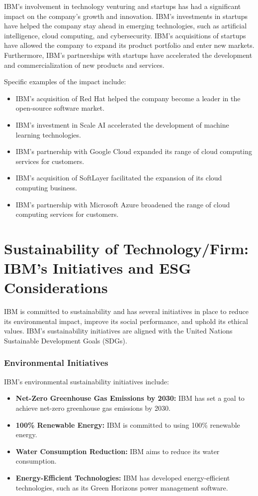 IBM's involvement in technology venturing and startups has had a significant impact on the company's growth and innovation. IBM's investments in startups have helped the company stay ahead in emerging technologies, such as artificial intelligence, cloud computing, and cybersecurity. IBM's acquisitions of startups have allowed the company to expand its product portfolio and enter new markets. Furthermore, IBM's partnerships with startups have accelerated the development and commercialization of new products and services.

Specific examples of the impact include:

\begin{itemize}
    \item IBM's acquisition of Red Hat helped the company become a leader in the open-source software market.
    \item IBM's investment in Scale AI accelerated the development of machine learning technologies.
    \item IBM's partnership with Google Cloud expanded its range of cloud computing services for customers.
    \item IBM's acquisition of SoftLayer facilitated the expansion of its cloud computing business.
    \item IBM's partnership with Microsoft Azure broadened the range of cloud computing services for customers.
\end{itemize}


\section{Sustainability of Technology/Firm: IBM's Initiatives and ESG Considerations}

IBM is committed to sustainability and has several initiatives in place to reduce its environmental impact, improve its social performance, and uphold its ethical values. IBM's sustainability initiatives are aligned with the United Nations Sustainable Development Goals (SDGs).

\subsubsection{Environmental Initiatives}

IBM's environmental sustainability initiatives include:

\begin{itemize}
    \item \textbf{Net-Zero Greenhouse Gas Emissions by 2030:} IBM has set a goal to achieve net-zero greenhouse gas emissions by 2030.
    \item \textbf{100\% Renewable Energy:} IBM is committed to using 100\% renewable energy.
    \item \textbf{Water Consumption Reduction:} IBM aims to reduce its water consumption.
    \item \textbf{Energy-Efficient Technologies:} IBM has developed energy-efficient technologies, such as its Green Horizons power management software.
\end{itemize}

